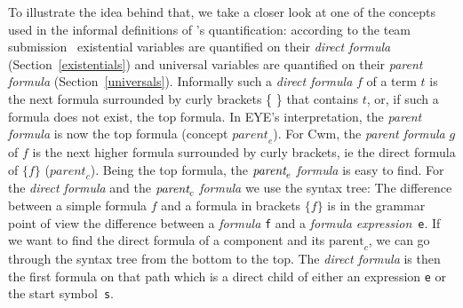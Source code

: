 To illustrate the idea behind that, we 
%
take  a closer look at one of the concepts used in the informal definitions of \nthree's quantification: %
according to the \wwwc team submission~\cite{Notation3} existential variables are quantified on their \emph{direct formula} (Section~\ref{existentials}) and 
universal variables are quantified on their \emph{parent formula} (Section~\ref{universals}). %
%
%
%
\label{parentformula}
Informally 
such a \emph{direct formula} $f$ of a term $t$ is the next formula surrounded by curly brackets \{ \} that contains $t$, or, if such a formula does not exist, 
the top formula. 
In EYE's interpretation, the \emph{parent formula} is now the top formula (concept $\textit{parent}_e$). 
For Cwm, the \emph{parent formula} $g$ of $f$ is the next higher formula surrounded by curly brackets, ie the direct formula of $\{f\}$ ($\textit{parent}_c$). %
%
Being the top formula, the $\emph{parent}_e$ \emph{formula} is easy to find. For the \emph{direct formula} and the $\emph{parent}_c$ \emph{formula} we use the syntax tree:
The difference between a simple formula $f$ and a formula in brackets $\{f\}$ is in the grammar point of view the difference between
a \emph{formula} \texttt{f} and a \emph{formula expression}~\texttt{e}.
If we want to find the direct formula of a component and its $\text{parent}_c$, we can go through the syntax tree from the bottom to the top.  
The \emph{direct formula} is then the first formula on that path which is a direct child of either an expression \texttt{e}  or the start symbol~\texttt{s}. 

